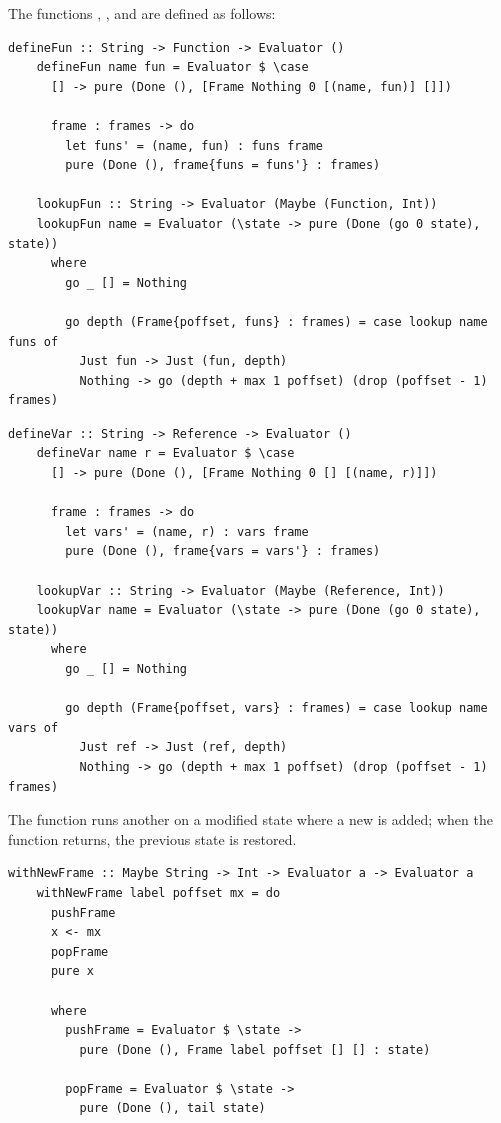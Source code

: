 \documentclass[UdineBachThesis,american,11pt]{PhdThesis}
\begin{document}
  The functions \lstinline@defineFun@, \lstinline@lookupFun@,
  \lstinline@defineVar@ and \lstinline@lookupVar@ are defined as follows:

  \begin{lstlisting}[gobble=4,basicstyle=\ttfamily\small]
    defineFun :: String -> Function -> Evaluator ()
    defineFun name fun = Evaluator $ \case
      [] -> pure (Done (), [Frame Nothing 0 [(name, fun)] []])

      frame : frames -> do
        let funs' = (name, fun) : funs frame
        pure (Done (), frame{funs = funs'} : frames)

    lookupFun :: String -> Evaluator (Maybe (Function, Int))
    lookupFun name = Evaluator (\state -> pure (Done (go 0 state), state))
      where
        go _ [] = Nothing

        go depth (Frame{poffset, funs} : frames) = case lookup name funs of
          Just fun -> Just (fun, depth)
          Nothing -> go (depth + max 1 poffset) (drop (poffset - 1) frames)
  \end{lstlisting}

  \newpage

  \begin{lstlisting}[gobble=4,basicstyle=\ttfamily\small]
    defineVar :: String -> Reference -> Evaluator ()
    defineVar name r = Evaluator $ \case
      [] -> pure (Done (), [Frame Nothing 0 [] [(name, r)]])

      frame : frames -> do
        let vars' = (name, r) : vars frame
        pure (Done (), frame{vars = vars'} : frames)

    lookupVar :: String -> Evaluator (Maybe (Reference, Int))
    lookupVar name = Evaluator (\state -> pure (Done (go 0 state), state))
      where
        go _ [] = Nothing

        go depth (Frame{poffset, vars} : frames) = case lookup name vars of
          Just ref -> Just (ref, depth)
          Nothing -> go (depth + max 1 poffset) (drop (poffset - 1) frames)
  \end{lstlisting}

  The function \lstinline@withNewFrame@ runs another \lstinline@Evaluator@ on a
  modified state where a new \lstinline@Frame@ is added; when the function
  returns, the previous state is restored.

  \begin{lstlisting}[gobble=4,basicstyle=\ttfamily\small]
    withNewFrame :: Maybe String -> Int -> Evaluator a -> Evaluator a
    withNewFrame label poffset mx = do
      pushFrame
      x <- mx
      popFrame
      pure x

      where
        pushFrame = Evaluator $ \state ->
          pure (Done (), Frame label poffset [] [] : state)

        popFrame = Evaluator $ \state ->
          pure (Done (), tail state)
  \end{lstlisting}
\end{document}
